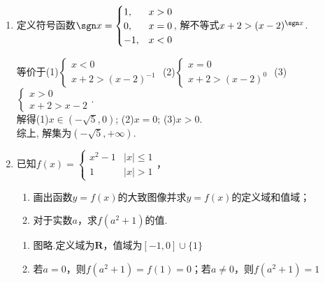 \begin{enumerate}
\item 定义符号函数$\sgn x=\begin{cases}
1,  & x>0\\
0,  & x=0\\
-1, & x<0\\
\end{cases}$,
解不等式$x+2>(x-2)^{\sgn x}$. 
\begin{jieda}
等价于(1)$\begin{cases}
x<0\\
x+2>(x-2)^{-1}
\end{cases}$
(2)$\begin{cases}
x=0\\
x+2>(x-2)^0
\end{cases}$
(3)$\begin{cases}
x>0\\
x+2>x-2
\end{cases}$. \\
解得(1)$x\in(-\sqrt{5},0)$; (2)$x=0$; (3)$x>0$. \\
综上, 解集为$(-\sqrt{5},+\infty)$. 
\end{jieda}

\begin{vspace_}
\vsp[3]
\end{vspace_}

\item 已知$f(x) = \left \{ \begin{array}{ll}
     x^2 - 1 & |x| \leq 1 \\
     1 & |x| > 1
\end{array}\right.$，
\begin{enumerate}
    \item 画出函数$y = f(x)$的大致图像并求$y = f(x)$的定义域和值域；
    \item 对于实数$a$，求$f(a^2+1)$的值.
\end{enumerate}

\begin{jieda}
\begin{enumerate}
    \item 图略.定义域为$\mathbf{R}$，值域为$[-1, 0] \cup \{1\}$
    \item 若$a = 0$，则$f(a^2+1) = f(1) = 0$；若$a \neq 0$，则$f(a^2+1) = 1$
\end{enumerate}
\end{jieda}

\begin{vspace_}
\vsp[3]
\end{vspace_}


\end{enumerate}
